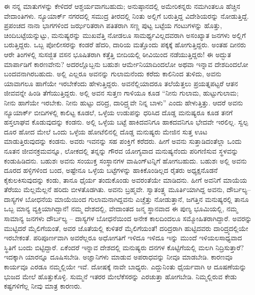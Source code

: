 ಈ ನನ್ನ ಮಾತುಗಳನ್ನು ಕೇಳಿದರೆ ಆಶ್ಚರ್ಯವಾಗಬಹುದು; ಅನುಷ್ಠಾನದಲ್ಲಿ ಅಮೇರಿಕನ್ನರು ನಮಗಿಂತಲೂ ಹೆಚ್ಚಿನ ವೇದಾಂತಿಗಳು. ನ್ಯೂಯಾರ್ಕ್​ ನಗರದಲ್ಲಿ ಸಮುದ್ರ ತೀರದಲ್ಲಿ ನಿಂತು ಅಲ್ಲಿಗೆ ಬರುತ್ತಿದ್ದ ವಿದೇಶಿಯರನ್ನು ನೋಡುತ್ತಿದ್ದೆ. ಪ್ರಪಂಚದ ನಾನಾ ಭಾಗಗಳಿಂದ ಜರ್ಝರಿತರಾಗಿ ಪತಿತರಾಗಿ ಸಣ್ಣ ಪುಟ್ಟ ಬಟ್ಟೆಯ ಗಂಟುಗಳನ್ನು ಹೊತ್ತು, ಚಿಂದಿಬಟ್ಟೆಯನ್ನುಟ್ಟು, ಮನುಷ್ಯರನ್ನು ಮುಖವೆತ್ತಿ ನೋಡಲೂ ಸಾಮರ್ಥ್ಯವಿಲ್ಲದವರಾಗಿ ಅಸಂಖ್ಯಾತ ಜನಗಳು ಅಲ್ಲಿಗೆ ಬರುತ್ತಿದ್ದರು. ಒಬ್ಬ ಪೋಲೀಸರನ್ನು ಕಂಡರೆ ಹೆದರಿ, ದಾರಿಯ ಮತ್ತೊಂದು ಪಕ್ಕಕ್ಕೆ ಹೋಗುತ್ತಿದ್ದರು. ಅಂತಹ ದೀನರು ಆರೇ ತಿಂಗಳಲ್ಲಿ ಸುಸಜ್ಜಿತ ವಸನ ಭೂಷಿತರಾಗಿ ಕತ್ತೆತ್ತಿ ಬೀದಿಯಲ್ಲಿ ಠೀವಿಯಿಂದ ನಡೆಯುತ್ತಿದ್ದರು! ಈ ಅದ್ಭುತ ಮಾರ್ಪಾಡಿಗೆ ಕಾರಣವೇನು? ಅದರಲ್ಲೊಬ್ಬನು ಬಹುಶಃ ಆರ್ಮೇನಿಯಾದಿಂದಲೋ ಅಥವಾ ಇನ್ನಾವ ದೇಶದಿಂದಲೋ ಬಂದವನಾಗಿರಬಹುದು. ಅಲ್ಲಿ ಎಲ್ಲರೂ ಅವನನ್ನು ಗುಲಾಮನೆಂದು ಕರೆದು ಕಾಲಿನಿಂದ ತುಳಿದು, ಅವನು ಯಾವಾಗಲೂ ಹಾಗೆಯೇ ಇರಬೇಕೆಂದು ಹೇಳುತ್ತಿದ್ದರು. ಅವನೆಲ್ಲಿಯಾದರೂ ತಲೆಯೆತ್ತಲು ಪ್ರಯತ್ನಪಟ್ಟರೆ ಆತನ ಜೀವವನ್ನೇ ಹಿಂಡಿ ತೆಗೆಯುತ್ತಿದ್ದರು. ಅಲ್ಲಿ ಅವನ ಸುತ್ತಣ ಗಾಳಿಯೂ ಕೂಡ “ನೀನು ಗುಲಾಮ, ಹುಟ್ಟುಗುಲಾಮ; ನೀನು ಹಾಗೆಯೇ ಇರಬೇಕು. ನೀನು ಹುಟ್ಟು ದರಿದ್ರ, ದಾರಿದ್ರ್ಯವೇ ನಿನ್ನ ಬಾಳು” ಎಂದು ಹೇಳುತ್ತಿತ್ತು. ಆದರೆ ಅವನು ನ್ಯೂಯಾರ್ಕ್​ ಬೀದಿಗಳಲ್ಲಿ ಕಾಲಿಟ್ಟ ಕೂಡಲೆ, ಒಳ್ಳೆಯ ಉಡುಪನ್ನು ಧರಿಸಿದ ದೊಡ್ಡ ಮನುಷ್ಯರೂ ಕೂಡ ತನಗೆ ಹಸ್ತಲಾಘವ ಕೊಡುವುದನ್ನು ಕಂಡನು. ಅಲ್ಲಿ ಒಳ್ಳೆಯ ಬಟ್ಟೆ ಹಾಕಿದವನಿಗೂ ಹಾಕದವನಿಗೂ ಭೇದವೇ ಇರಲಿಲ್ಲ. ಸ್ವಲ್ಪ ದೂರ ಹೋದ ಮೇಲೆ ಒಂದು ಒಳ್ಳೆಯ ಹೋಟೆಲಿನಲ್ಲಿ ದೊಡ್ಡ ಮನುಷ್ಯರು ಮೇಜಿನ ಸುತ್ತ ಊಟ ಮಾಡುತ್ತಿರುವುದನ್ನು ಕಂಡನು. ಅವರು ಇವನನ್ನು ಸಹ ಪಂಕ್ತಿಗೆ ಕರೆದರು. ಹೀಗೆ ಅವನು ಸುತ್ತಾಡಿದಂತೆಲ್ಲಾ ಒಂದು ನೂತನ ಜೀವನಕ್ರಮವನ್ನೂ, ಲೋಕದಲ್ಲಿ ತನ್ನನ್ನು ಗೌರವ ಯೋಗ್ಯವಾದ ಮನುಷ್ಯನೆಂದು ಪರಿಗಣಿಸುವ ಸ್ಥಳವನ್ನು ಕಂಡುಹಿಡಿದನು. ಬಹುಶಃ ಅವನು ಸಂಯುಕ್ತ ಸಂಸ್ಥಾನಗಳ ವಾಷಿಂಗ್​ಟನ್ನಿಗೆ ಹೋಗಬಹುದು. ಬಹುಶಃ ಅಲ್ಲಿ ಅವನು ದೂರದ ಹಳ್ಳಿಗಳಿಂದ ಬಂದ, ಅಷ್ಟೇನೂ ಒಳ್ಳೆಯ ಬಟ್ಟೆಗಳನ್ನು ಹಾಕಿಕೊಂಡಿಲ್ಲದ ರೈತರು ಅಧ್ಯಕ್ಷನೊಡನೆ ಕೈಕುಲಕಿಸುವುದನ್ನು ಕಂಡು, ತಾನೂ ಧೈರ್ಯ ತಂದುಕೊಂಡು ಅವರಂತೆಯೇ ಮಾಡಿದನು. ಹೀಗೆ ಅವನಿಗೆ ಮಾಯೆಯ ತೆರೆಯು ಮೆಲ್ಲಮೆಲ್ಲನೆ ಹರಿದು ಬೀಳತೊಡಗಿತು. ಅವನು ಬ್ರಹ್ಮವೇ. ಸ್ವಾತಂತ್ರ್ಯ ಮೂರ್ತಿಯಾಗಿದ್ದ ಅವನು, ದೌರ್ಬಲ್ಯ–ದಾಸ್ಯಗಳ ಬೋಧನೆಯ ಮಾಯೆಯಿಂದ ಗುಲಾಮನಾಗಿದ್ದವನು ಎಚ್ಚೆತ್ತು ನೋಡುತ್ತಾನೆ, ಜಗತ್ತಿನ ಮನುಷ್ಯರಲ್ಲಿ ತಾನೂ ಒಬ್ಬ ಮಾನ್ಯ ವ್ಯಕ್ತಿಯಾಗಿದ್ದಾನೆ! ನಮ್ಮ ದೇಶದಲ್ಲಿ, ವೇದಾಂತದ ಜನ್ಮ ಸ್ಥಾನವಾದ ಈ ಪುಣ್ಯ ಭೂಮಿಯಲ್ಲಿ, ನಮ್ಮ ಸಾಮಾನ್ಯ ಜನಗಳು ದೌರ್ಬಲ್ಯ – ದಾಸ್ಯಗಳ ಬೋಧನೆಯಿಂದ ಅನೇಕ ಕಾಲದಿಂದಲೂ ಸಮ್ಮೋಹಿತರಾಗಿದ್ದಾರೆ. ಅವರನ್ನು ಮುಟ್ಟಿದರೆ ಮೈಲಿಗೆಯಂತೆ, ಅವರ ಜೊತೆಯಲ್ಲಿ ಕುಳಿತರೆ ಮೈಲಿಗೆಯಂತೆ! ದರಿದ್ರರಾಗಿ ಹುಟ್ಟಿದವರು ದಾರಿದ್ರ್ಯದಲ್ಲಿಯೇ ಇರಬೇಕಂತೆ. ಪರಿಪೂರ್ಣವಾಗಿ ಅವರೆಲ್ಲರೂ ಅಧೋಗತಿಗೆ ಇಳಿದೂ ಇಳಿದೂ ಇನ್ನು ಮುಂದೆ ಇಳಿಯಲಸಾಧ್ಯವಾದ ಸ್ಥಿತಿಗೆ ಬಂದು ಬಿಟ್ಟಿದ್ದಾರೆ. ಏಕೆಂದರೆ ಇನ್ನಾವ ದೇಶದಲ್ಲಿ ಮನುಷ್ಯರು ದನಗಳ ಕೊಟ್ಟಿಗೆಯಲ್ಲಿ ಮಲಗಿ ನಿದ್ರಿಸುತ್ತಾರೆ? ಇದಕ್ಕಾಗಿ ಯಾರನ್ನೂ ದೂಷಿಸಬೇಡಿ. ಅಜ್ಞಾನಿಗಳು ಮಾಡುವ ಅಪರಾಧವನ್ನು ನೀವೂ ಮಾಡಬೇಡಿ. ಕಾರಣವೂ ಕಾರ್ಯವೂ ಎರಡೂ ನಮ್ಮಲ್ಲಿಯೇ ಇವೆ. ದೋಷಕ್ಕೆ ನಾವೇ ಬಾಧ್ಯರು. ಎದ್ದುನಿಂತು ಧೈರ್ಯವಾಗಿ ಆ ದೂಷಣೆಯನ್ನು ಭುಜದ ಮೇಲೆ ಹೊತ್ತುಕೊಳ್ಳಿ. ಸುಮ್ಮನೆ ಇತರರ ಮೇಲೆ\break ಕೆಸರನ್ನು ಎರಚುತ್ತಾ ಹೋಗಬೇಡಿ. ನಿಮ್ಮಲ್ಲಿರುವ ಕೇಡು ಕಷ್ಟಗಳಿಗೆಲ್ಲ ನೀವು ಮಾತ್ರ ಕಾರಣರು. 

